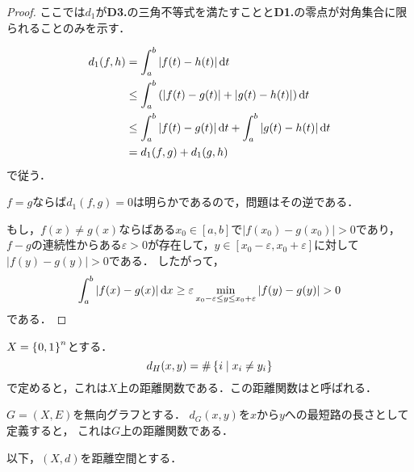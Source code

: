 \documentclass[uplatex]{jsarticle}
\begin{document}
\begin{proof}
    ここでは$d_{1}$が\textbf{D3.}の三角不等式を満たすことと\textbf{D1.}の零点が対角集合に限られることのみを示す．

    \begin{align*}
        d_{1} (f,h)
        &= \int_{a}^{b} \left| f(t) - h(t) \right| \mathrm{d}t \\
      &\le \int_{a}^{b} \left( \left| f(t) - g(t) \right| + \left| g(t) - h(t) \right| \right) \mathrm{d}t \\
      &\le \int_{a}^{b} \left| f(t) - g(t) \right| \mathrm{d}t +  \int_{a}^{b} \left| g(t) - h(t) \right| \mathrm{d}t \\
        &= d_{1} (f,g) + d_{1} (g,h)
    \end{align*}
    で従う．


    $f = g$ならば$d_{1} (f,g) = 0$は明らかであるので，問題はその逆である．

    もし，$f(x) \neq g(x)$ならばある$x_{0} \in [a,b]$で$\left| f(x_{0}) - g(x_{0}) \right|> 0$であり，
    $f-g$の連続性からある$\varepsilon > 0$が存在して，$y \in [x_{0} - \varepsilon, x_{0} + \varepsilon]$に対して
    $\left| f(y) - g(y) \right| > 0$である．
    したがって，
    \begin{equation*}
        \int_{a}^{b} \left| f(x) - g(x) \right| \mathrm{d}x \ge \varepsilon \min_{x_{0} - \varepsilon \le y \le x_{0} + \varepsilon} \left| f(y) - g(y) \right| > 0
    \end{equation*}
    である．
\end{proof}

\begin{rei}
    $X = \Set{\hspace{-1.8pt} 0,1 \hspace{-1.8pt}}^{n}$とする．
    \begin{equation}
        d_{H}(x,y) = \# \Set{\hspace{-1.8pt} i | x_{i} \neq y_{i} \hspace{-1.8pt}}
    \end{equation}
    で定めると，これは$X$上の距離関数である．この距離関数はと呼ばれる．
\end{rei}

\begin{rei}
    $G = (X,E)$を無向グラフとする．
    $d_{G}(x,y)$を$x$から$y$への最短路の長さとして定義すると，
    これは$G$上の距離関数である．
\end{rei}

以下，$(X,d)$を距離空間とする．
\end{document}
